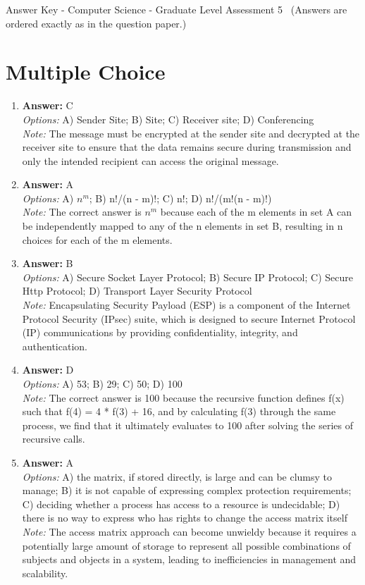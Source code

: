 \documentclass[12pt]{article}
\begin{document}
\begin{center}
Answer Key - Computer Science - Graduate Level Assessment 5 \
\small (Answers are ordered exactly as in the question paper.)
\end{center}

\section*{Multiple Choice}
\begin{enumerate}[label=\arabic*.]
\item \textbf{Answer:} C
\\ \textit{Options:} A) Sender Site; B) Site; C) Receiver site; D) Conferencing
\\ \textit{Note:} The message must be encrypted at the sender site and decrypted at the receiver site to ensure that the data remains secure during transmission and only the intended recipient can access the original message.
\item \textbf{Answer:} A
\\ \textit{Options:} A) $n^m$; B) n!/(n - m)!; C) n!; D) n!/(m!(n - m)!)
\\ \textit{Note:} The correct answer is $n^m$ because each of the m elements in set A can be independently mapped to any of the n elements in set B, resulting in n choices for each of the m elements.
\item \textbf{Answer:} B
\\ \textit{Options:} A) Secure Socket Layer Protocol; B) Secure IP Protocol; C) Secure Http Protocol; D) Transport Layer Security Protocol
\\ \textit{Note:} Encapsulating Security Payload (ESP) is a component of the Internet Protocol Security (IPsec) suite, which is designed to secure Internet Protocol (IP) communications by providing confidentiality, integrity, and authentication.
\item \textbf{Answer:} D
\\ \textit{Options:} A) 53; B) 29; C) 50; D) 100
\\ \textit{Note:} The correct answer is 100 because the recursive function defines f(x) such that f(4) = 4 * f(3) + 16, and by calculating f(3) through the same process, we find that it ultimately evaluates to 100 after solving the series of recursive calls.
\item \textbf{Answer:} A
\\ \textit{Options:} A) the matrix, if stored directly, is large and can be clumsy to manage; B) it is not capable of expressing complex protection requirements; C) deciding whether a process has access to a resource is undecidable; D) there is no way to express who has rights to change the access matrix itself
\\ \textit{Note:} The access matrix approach can become unwieldy because it requires a potentially large amount of storage to represent all possible combinations of subjects and objects in a system, leading to inefficiencies in management and scalability.
\end{enumerate}
\end{document}
